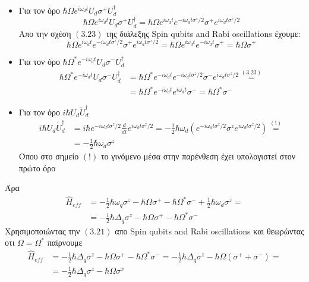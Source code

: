 \documentclass[12pt]{article}
\begin{document}
\begin{itemize}
    Όπου στο σημείο $(*)$ χρησιμοποιήσαμε οτι 
    $$\sigma^z = \ket{0}\bra{0}-\ket{1}\bra{1} \textnormal{   και   } e^{-i\omega_d t \sigma^z/2} = e^{-i\omega_d t (+1)/2}\ket{0}\bra{0}+  e^{-i\omega_d t (-1)/2}\ket{1}\bra{1}$$
    Αρα $\frac{1}{2}\hbar \omega_qU_d\sigma^zU_d^\dag = \frac{1}{2}\hbar \omega_q\sigma^z$
    \item Για τον όρο $\hbar\Omega e^{i \omega_d t}U_d\sigma^+U_d^\dag$
        $$\hbar\Omega e^{i \omega_d t}U_d\sigma^+U_d^\dag = \hbar\Omega e^{i \omega_d t}e^{-i\omega_d t \sigma^z/2}\sigma^+e^{i\omega_d t \sigma^z/2}$$
        Απο την σχέση $(3.23)$ της διάλεξης \textlatin{Spin qubits and Rabi oscillations} έχουμε:
        $$\hbar\Omega e^{i \omega_d t}e^{-i\omega_d t \sigma^z/2}\sigma^+e^{i\omega_d t \sigma^z/2} = \hbar\Omega e^{i \omega_d t}e^{-i\omega_d t }\sigma^+ = \hbar\Omega \sigma^+$$
    \item Για τον όρο $\hbar\Omega^* e^{-i \omega_d t}U_d\sigma^-U_d^\dag $
        \begin{align*}
            \hbar\Omega^* e^{-i \omega_d t}U_d\sigma^-U_d^\dag &=  \hbar\Omega^* e^{-i \omega_d t}e^{-i\omega_d t \sigma^z/2}\sigma^-e^{i\omega_d t \sigma^z/2}\stackrel{(3.23)}{=}\\
            &=\hbar\Omega^* e^{-i \omega_d t}e^{i\omega_d t }\sigma^- = \hbar\Omega^* \sigma^-
        \end{align*}
    \item Για τον όρο $i\hbar U_d \dot{U}^\dag_d $
        \begin{align*}
            i\hbar U_d \dot{U}^\dag_d &=  i\hbar e^{-i\omega_d t \sigma^z/2}\frac{d}{dt}e^{i\omega_d t \sigma^z/2}=-\frac{1}{2}\hbar \omega_d\left(e^{-i\omega_d t \sigma^z/2}\sigma^ze^{i\omega_d t \sigma^z/2}\right) \stackrel{(!)}{=}\\
            &=-\frac{1}{2}\hbar \omega_d\sigma^z
        \end{align*}
        Όπου στο σημείο $(!)$ το γινόμενο μέσα στην παρένθεση έχει υπολογιστεί στον πρώτο όρο 
    \end{itemize}

    Άρα 
    \begin{align*}
        \hat{H}_{eff}&= -\frac{1}{2}\hbar \omega_q\sigma^z - \hbar\Omega \sigma^+ -\hbar\Omega^* \sigma^- + \frac{1}{2}\hbar \omega_d\sigma^z =\\
        &=-\frac{1}{2}\hbar \Delta_q\sigma^z - \hbar\Omega \sigma^+ -\hbar\Omega^* \sigma^-
    \end{align*}
    Χρησιμοποιώντας την $(3.21)$ απο \textlatin{Spin qubits and Rabi oscillations} και θεωρώντας οτι $\Omega=\Omega^*$ παίρνουμε
    \begin{align*}
        \hat{H}_{eff}&= -\frac{1}{2}\hbar \Delta_q\sigma^z - \hbar\Omega \sigma^+ -\hbar\Omega^* \sigma^- = -\frac{1}{2}\hbar \Delta_q\sigma^z - \hbar\Omega (\sigma^+ + \sigma^-) =\\
        &= -\frac{1}{2}\hbar \Delta_q\sigma^z - \hbar\Omega \sigma^x
    \end{align*}
\end{document}

